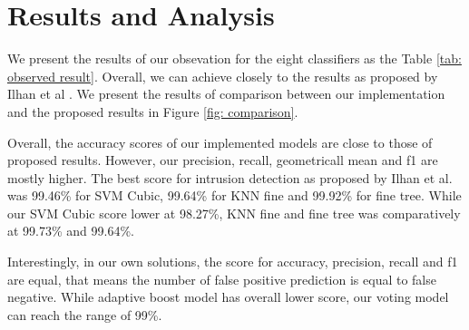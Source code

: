 \section{Results and Analysis} \label{Sec: Result}

We present the results of our obsevation for the eight classifiers as the Table \ref{tab: observed result}.
Overall, we can achieve closely to the results as proposed by Ilhan et al \cite{kilincer2021machine}.
We present the results of comparison between our implementation and the proposed results in Figure \ref{fig: comparison}.

Overall, the accuracy scores of our implemented models are close to those of proposed results.
However, our precision, recall, geometricall mean and f1 are mostly higher.
The best score for intrusion detection as proposed by Ilhan et al. \cite{kilincer2021machine} was 99.46\% for SVM Cubic, 99.64\% for KNN fine and 99.92\% for fine tree.
While our SVM Cubic score lower at 98.27\%, KNN fine and fine tree was comparatively at 99.73\% and 99.64\%.

Interestingly, in our own solutions, the score for accuracy, precision, recall and f1 are equal, that means the number of false positive prediction is equal to false negative.
While adaptive boost model has overall lower score, our voting model can reach the range of 99\%.


